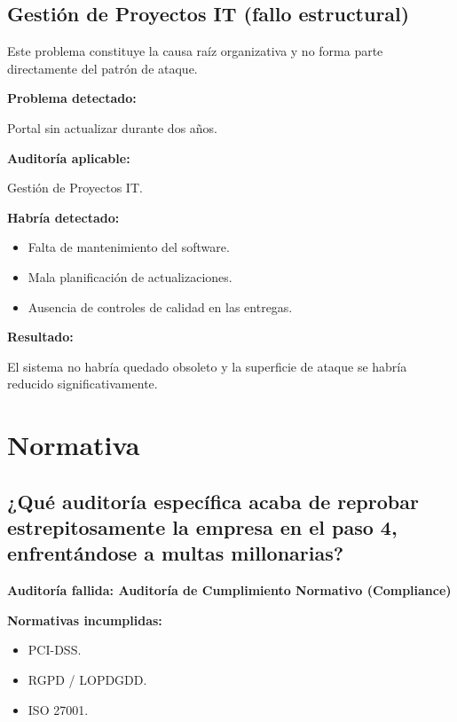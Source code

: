 \documentclass[11pt,a4paper]{article}
\begin{document}

\subsection{Gestión de Proyectos IT (fallo estructural)}

Este problema constituye la causa raíz organizativa y no forma parte directamente del patrón de ataque.

\textbf{Problema detectado:}

Portal sin actualizar durante dos años.

\textbf{Auditoría aplicable:}

Gestión de Proyectos IT.

\textbf{Habría detectado:}

\begin{itemize}
    \item Falta de mantenimiento del software.
    \item Mala planificación de actualizaciones.
    \item Ausencia de controles de calidad en las entregas.
\end{itemize}

\textbf{Resultado:}

El sistema no habría quedado obsoleto y la superficie de ataque se habría reducido significativamente.


\section{Normativa}

\subsection{¿Qué auditoría específica acaba de reprobar estrepitosamente la empresa en el paso 4, enfrentándose a multas millonarias?}

\begin{tcolorbox}
\textbf{Auditoría fallida: Auditoría de Cumplimiento Normativo (Compliance)}
\end{tcolorbox}

\textbf{Normativas incumplidas:}

\begin{itemize}
    \item PCI-DSS.
    \item RGPD / LOPDGDD.
    \item ISO 27001.
\end{itemize}
\end{document}
